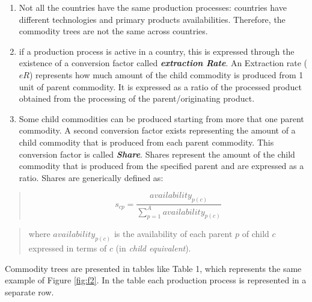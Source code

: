 \documentclass[]{article}
\begin{document}
\begin{enumerate}
\def\labelenumi{\arabic{enumi}.}
\setcounter{enumi}{1}
\item
  Not all the countries have the same production processes: countries
  have different technologies and primary products availabilities.
  Therefore, the commodity trees are not the same across countries.
\item
  if a production process is active in a country, this is expressed
  through the existence of a conversion factor called
  \textbf{\emph{extraction Rate}}. An Extraction rate (\(eR\))
  represents how much amount of the child commodity is produced from 1
  unit of parent commodity. It is expressed as a ratio of the processed
  product obtained from the processing of the parent/originating
  product.
\item
  Some child commodities can be produced starting from more that one
  parent commodity. A second conversion factor exists representing the
  amount of a child commodity that is produced from each parent
  commodity. This conversion factor is called \textbf{\emph{Share}}.
  Shares represent the amount of the child commodity that is produced
  from the specified parent and are expressed as a ratio. Shares are
  generically defined as:
\end{enumerate}

\begin{quote}
\begin{equation}
\label{eq:sharesGen}
s_{cp} = \frac{availability_{p(c)}}{\sum \limits_{p=1}^A{availability_{p(c)}}}
\end{equation}
\end{quote}

\begin{quote}
where \(availability_{p(c)}\) is the availability of each parent \(p\)
of child \(c\) expressed in terms of \(c\) (in \emph{child equivalent}).
\end{quote}

Commodity trees are presented in tables like Table 1, which represents
the same example of Figure \ref{fig:f2}. In the table each production
process is represented in a separate row.
\end{document}

